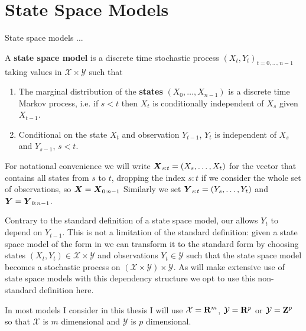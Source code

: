 \chapter{State Space Models}
\label{chapt:ssm}

State space models ...


\begin{definition}
    \label{def:ssm}
    A \textbf{state space model} is a discrete time stochastic process $(X_t, Y_t)_{t=0, \dots, n -1}$ taking values in $\mathcal X \times \mathcal Y$ such that
    \begin{enumerate}
        \item The marginal distribution of the \textbf{states} $(X_0, \dots, X_{n - 1})$ is a discrete time Markov process, i.e. if $s <t$ then $X_t$ is conditionally independent of $X_s$ given $X_{t - 1}$.
        \item Conditional on the state $X_t$ and observation $Y_{t - 1}$, $Y_t$ is independent of $X_s$ and $Y_{s - 1}$, $s < t$.
    \end{enumerate}
\end{definition}

For notational convenience we will write $\boldsymbol{X}_{s:t} = \left(X_s, \dots, X_{t}\right)$ for the vector that contains all states from $s$ to $t$, dropping the index $s:t$ if we consider the whole set of observations, so $\boldsymbol{X} = \boldsymbol{X}_{0:n-1}$ 
Similarly we set $\boldsymbol{Y}_{s:t} = \left(Y_s, \dots, Y_{t}\right)$ and $\boldsymbol{Y} = \boldsymbol{Y}_{0:n-1}$.



\begin{remark}
    Contrary to the standard definition of a state space model, our  allows $Y_t$ to depend on $Y_{t - 1}$.
    This is not a limitation of the standard definition: given a state space model of the form in  we can transform it to the standard form by choosing states $(X_t, Y_t) \in \mathcal X \times \mathcal Y$ and observations $Y_t \in \mathcal Y$ such that the state space model becomes a stochastic process on $ \left( \mathcal X \times \mathcal Y\right) \times \mathcal Y$.
    As  will make extensive use of state space models with this dependency structure we opt to use this non-standard definition here.

    In most models I consider in this thesis I will use $\mathcal X = \mathbf R^m$, $\mathcal Y = \mathbf R^p$ or $\mathcal Y = \mathbf Z^p$ so that $\mathcal X$ is $m$ dimensional and $\mathcal Y$ is $p$ dimensional.
\end{remark}

